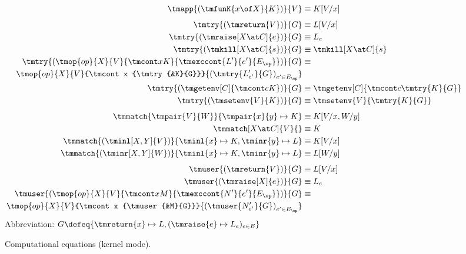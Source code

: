 \begin{figure}[tb]
  \centering
  \parbox{\textwidth}{
  \small
  \begin{align*}
    \tmapp{(\tmfunK{x \of X}{K})}{V} &\equiv K[V/x]
    \\[1ex]
    \tmtry{(\tmreturn{V})}{G} &\equiv L[V/x]
    \\
    \tmtry{(\tmraise[X \at C]{e})}{G} &\equiv L_{e}
    \\
    \tmtry{(\tmkill[X \at C]{s})}{G} &\equiv \tmkill[X \at C]{s}
    \\
    \tmtry{(
      \tmop{op}{X}{V}{\tmcont x K}{\tmexccont {L'} {e'} {E_\op}}
    )}{G} &\equiv \\
    \tmop{op}{X}{V}{\tmcont x {\tmtry{&K}{G}}}{\left(\tmtry{L'_{e'}}{G}\right)_{e' \in E_\op}}
    \\
    \tmtry{(\tmgetenv[C]{\tmcont c K})}{G} &\equiv \tmgetenv[C]{\tmcont c {\tmtry{K}{G}}}
    \\
    \tmtry{(\tmsetenv{V}{K})}{G} &\equiv \tmsetenv{V}{\tmtry{K}{G}}
    \\[1ex]
    \tmmatch{\tmpair{V}{W}}{\tmpair{x}{y} \mapsto K} &\equiv
    K[V/x, W/y]
    \\
    \tmmatch[X \at C]{V}{} &\equiv
    K
    \\
    \tmmatch{(\tminl[X,Y]{V})}{\tminl{x} \mapsto K, \tminr{y} \mapsto L} &\equiv
    K[V/x]
    \\
    \tmmatch{(\tminr[X,Y]{W})}{\tminl{x} \mapsto K, \tminr{y} \mapsto L} &\equiv
    L[W/y]
    \\[1ex]
    \tmuser{(\tmreturn{V})}{G} &\equiv L[V/x]
    \\
    \tmuser{(\tmraise[X]{e})}{G} &\equiv L_e
    \\
    \tmuser{(
      \tmop{op}{X}{V}{\tmcont x M}{\tmexccont {N'} {e'} {E_\op}}
    )}{G} &\equiv \\
    \tmop{op}{X}{V}{\tmcont x {\tmuser{&M}{G}}}{\left(\tmuser{N'_{e'}}{G} \right)_{e' \in E_\op}}
  \end{align*}
  Abbreviation: $G \defeq \{ \tmreturn{x} \mapsto L, (\tmraise{e} \mapsto L_e)_{e \in E} \}$
  } %
  \caption{Computational equations (kernel mode).}
  \label{fig:computational-equations-kernel}
\end{figure}


